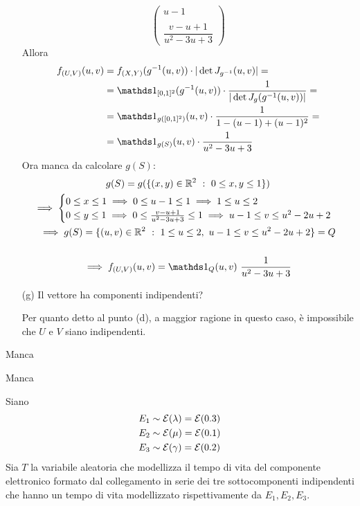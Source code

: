 \begin{enumerate}
\[\begin{pmatrix}
u-1 \\ \, \\\dfrac{v-u+1}{u^2-3u+3}
\end{pmatrix}
\]
Allora
\begin{gather*}
\begin{aligned}
f_{(U,V)}(u,v)&=\fXY(g^{-1}(u,v))\cdot |\det J_{g^{-1}}(u,v)|=\\
&=\Ind_{[0,1]^2}(g^{-1}(u,v))\cdot\frac{1}{|\det J_g(g^{-1}(u,v))|}=\\
&=\Ind_{g([0,1]^2)}(u,v)\cdot\frac{1}{1-(u-1)+(u-1)^2}=\\
&=\Ind_{g(S)}(u,v)\cdot\frac{1}{u^2-3u+3}
\end{aligned}
\end{gather*}
Ora manca da calcolare $g(S)$:
\begin{gather*}
g(S)=g(\{(x,y)\in\RR^2\ :\ 0\leq x,y\leq 1 \}) \\
\implies \begin{cases}0\leq x\leq 1\implies 0\leq u-1\leq 1\implies 1\leq u \leq 2 \\ 0\leq y\leq 1\implies 0\leq \frac{v-u+1}{u^2-3u+3} \leq 1 \implies u-1\leq v\leq u^2-2u+2   \end{cases} \\
\implies g(S)=\{(u,v)\in\RR^2\ :\ 1\leq u \leq 2,\ u-1\leq v\leq u^2-2u+2 \}=Q\\
\, \\
\implies f_{(U,V)}(u,v)=\Ind_Q(u,v)\ \frac{1}{u^2-3u+3}
\end{gather*}

\item [(g)] Il vettore ha componenti indipendenti?

Per quanto detto al punto (d), a maggior ragione in questo caso, è impossibile che $U$ e $V$ siano indipendenti.

\end{enumerate}

\Soluzione{}
Manca

\Soluzione{}
Manca

\Soluzione{}
Siano 
\begin{align*}
E_1&\sim\mathcal{E}(\lambda)=\mathcal{E}(0.3) \\
E_2&\sim\mathcal{E}(\mu)=\mathcal{E}(0.1) \\
E_3&\sim\mathcal{E}(\gamma)=\mathcal{E}(0.2)
\end{align*}
Sia $T$ la variabile aleatoria che modellizza il tempo di vita del componente elettronico formato dal collegamento in serie dei tre sottocomponenti indipendenti che hanno un tempo di vita modellizzato rispettivamente da $E_1,E_2,E_3$.

